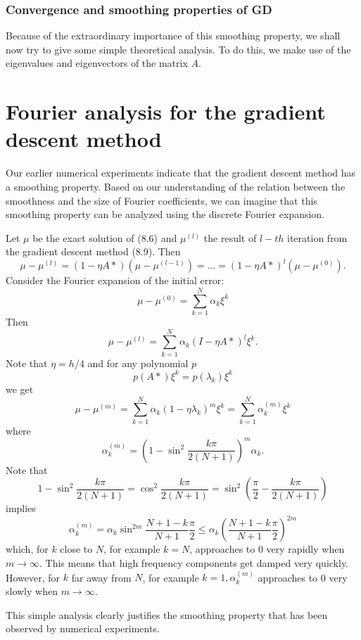 \documentclass[10pt]{article}
\begin{document}
\subsubsection{Convergence and smoothing properties of GD}
Because of the extraordinary importance of this smoothing property, we shall now try to give some simple theoretical analysis. To do this, we make use of the eigenvalues and eigenvectors of the matrix $A$.

\section{Fourier analysis for the gradient descent method}
Our earlier numerical experiments indicate that the gradient descent method has a smoothing property. Based on our understanding of the relation between the smoothness and the size of Fourier coefficients, we can imagine that this smoothing property can be analyzed using the discrete Fourier expansion.

Let $\mu$ be the exact solution of (8.6) and $\mu^{(l)}$ the result of $l-t h$ iteration from the gradient descent method (8.9). Then
$$
\mu-\mu^{(l)}=(1-\eta A *)\left(\mu-\mu^{(l-1)}\right)=\ldots=(1-\eta A *)^{l}\left(\mu-\mu^{(0)}\right) .
$$
Consider the Fourier expansion of the initial error:
$$
\mu-\mu^{(0)}=\sum_{k=1}^{N} \alpha_{k} \xi^{k}
$$
Then
$$
\mu-\mu^{(l)}=\sum_{k=1}^{N} \alpha_{k}(I-\eta A *)^{l} \xi^{k} .
$$
Note that $\eta=h / 4$ and for any polynomial $p$
$$
p(A *) \xi^{k}=p\left(\lambda_{k}\right) \xi^{k}
$$
we get
$$
\mu-\mu^{(m)}=\sum_{k=1}^{N} \alpha_{k}\left(1-\eta \lambda_{k}\right)^{m} \xi^{k}=\sum_{k=1}^{N} \alpha_{k}^{(m)} \xi^{k}
$$
where
$$
\alpha_{k}^{(m)}=\left(1-\sin ^{2} \frac{k \pi}{2(N+1)}\right)^{m} \alpha_{k} .
$$
Note that
$$
1-\sin ^{2} \frac{k \pi}{2(N+1)}=\cos ^{2} \frac{k \pi}{2(N+1)}=\sin ^{2}\left(\frac{\pi}{2}-\frac{k \pi}{2(N+1)}\right)
$$
implies
$$
\alpha_{k}^{(m)}=\alpha_{k} \sin ^{2 m} \frac{N+1-k}{N+1} \frac{\pi}{2} \leq \alpha_{k}\left(\frac{N+1-k}{N+1} \frac{\pi}{2}\right)^{2 m}
$$
which, for $k$ close to $N$, for example $k=N$, approaches to 0 very rapidly when $m \rightarrow \infty$. This means that high frequency components get damped very quickly. However, for $k$ far away from $N$, for example $k=1, \alpha_{k}^{(m)}$ approaches to 0 very slowly when $m \rightarrow \infty$.

This simple analysis clearly justifies the smoothing property that has been observed by numerical experiments.\\
\end{document}
